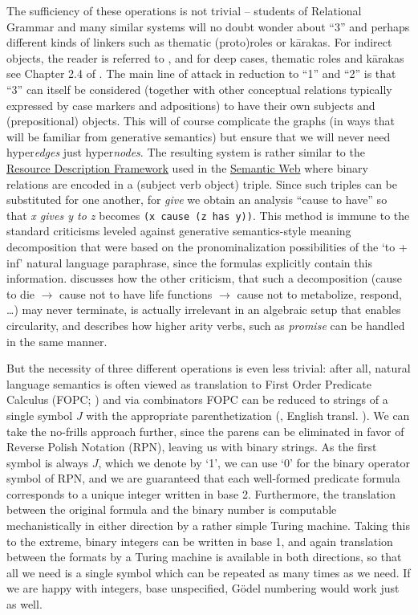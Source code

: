\documentclass[output=paper,colorlinks=true,citecolor=brown]{langscibook}
\begin{document}
The sufficiency of these operations is not trivial -- students of Relational
Grammar and many similar systems will no doubt wonder about ``3'' and perhaps
different kinds of linkers such as thematic (proto)roles or k\={a}rakas. For
indirect objects, the reader is referred to \citet{Kornai:2012}, and for deep
cases, thematic roles and k\={a}rakas see Chapter 2.4 of \citet{Kornai:2022}.
The main line of attack in reduction to ``1'' and ``2'' is that ``3'' can itself be
considered (together with other conceptual relations typically expressed by
case markers and adpositions) to have their own subjects and (prepositional)
objects. This will of course complicate the graphs (in ways that will be
familiar from generative semantics) but ensure that we will never need
hyper\textit{edges} just hyper\textit{nodes}. The resulting system is rather similar
to the
\href{https://en.wikipedia.org/wiki/Resource_Description_Framework}{Resource
  Description Framework} used in the
\href{https://en.wikipedia.org/wiki/Semantic_Web}{Semantic Web} where binary
relations are encoded in a (subject verb object) triple. Since such
triples can be substituted for one another, for \textit{give} we obtain an analysis
``cause to have'' so that \textit{x gives y to z} becomes \texttt{(x cause (z has
  y))}. This method is immune to the standard criticisms \citep{Fodor:1970}
leveled against generative semantics-style meaning decomposition that were
based on the pronominalization possibilities of the `to + inf' natural
language paraphrase, since the formulas explicitly contain this information.
\citet{Kornai:2010} discusses how the other criticism, that such a
decomposition (cause to die $\rightarrow$ cause not to have life functions
$\rightarrow$ cause not to metabolize, respond, \ldots) may never terminate,
is actually irrelevant in an algebraic setup that enables circularity, and
\citet{Kornai:2012} describes how higher arity verbs, such as \textit{promise} can
be handled in the same manner. 

But the necessity of three different operations is even less trivial: after all,
natural language semantics is often viewed as translation to First Order
Predicate Calculus (FOPC; \cite{Blackburn:2015}) and via combinators
\citep{Curry:1958} FOPC can be reduced to strings of a single symbol $J$ with
the appropriate parenthetization (\cite{Schoenfinkel:1924}, English
transl. \cite{Heijenoort:1967}). We can take the no-frills approach further,
since the parens can be eliminated in favor of Reverse Polish Notation (RPN),
leaving us with binary strings. As the first symbol is always $J$, which we
denote by `1', we can use `0' for the binary operator symbol of RPN, and we
are guaranteed that each well-formed predicate formula corresponds to a unique
integer written in base 2. Furthermore, the translation between the original
formula and the binary number is computable mechanistically in either
direction by a rather simple Turing machine. Taking this to the extreme,
binary integers can be written in base 1, and again translation between the
formats by a Turing machine is available in both directions, so that all we need
is a single symbol which can be repeated as many times as we need. If we are
happy with integers, base unspecified, Gödel numbering would work just as
well.
\end{document}
